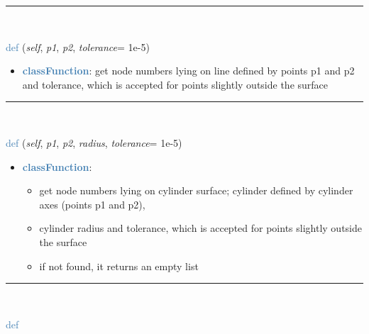 \begin{itemize}[leftmargin=1.4cm]
\begin{itemize}[leftmargin=1.4cm]
\begin{itemize}[leftmargin=1.4cm]
\begin{itemize}[leftmargin=0.5cm]
\begin{itemize}[leftmargin=1.4cm]
\begin{itemize}[leftmargin=1.4cm]
\begin{itemize}[leftmargin=1.4cm]
\begin{itemize}[leftmargin=0.5cm]
%
\noindent\rule{8cm}{0.75pt}\vspace{1pt} \\ 
\begin{flushleft}
\noindent \textcolor{steelblue}{def {\bf {}}}\label{sec:FEM:FEMinterface:GetNodesOnLine}
({\it self}, {\it p1}, {\it p2}, {\it tolerance}= 1e-5)
\end{flushleft}
\setlength{\itemindent}{0.7cm}
\begin{itemize}[leftmargin=0.7cm]
\item[--]\textcolor{steelblue}{\bf classFunction}: get node numbers lying on line defined by points p1 and p2 and tolerance, which is accepted for points slightly outside the surface
\vspace{12pt}\end{itemize}
%
\noindent\rule{8cm}{0.75pt}\vspace{1pt} \\ 
\begin{flushleft}
\noindent \textcolor{steelblue}{def {\bf {}}}\label{sec:FEM:FEMinterface:GetNodesOnCylinder}
({\it self}, {\it p1}, {\it p2}, {\it radius}, {\it tolerance}= 1e-5)
\end{flushleft}
\setlength{\itemindent}{0.7cm}
\begin{itemize}[leftmargin=0.7cm]
\item[--]\textcolor{steelblue}{\bf classFunction}: \vspace{-6pt}
\begin{itemize}[leftmargin=1.2cm]
\setlength{\itemindent}{-0.7cm}
\item[]get node numbers lying on cylinder surface; cylinder defined by cylinder axes (points p1 and p2),
\item[]cylinder radius and tolerance, which is accepted for points slightly outside the surface
\item[]if not found, it returns an empty list
\end{itemize}
\vspace{12pt}\end{itemize}
%
\noindent\rule{8cm}{0.75pt}\vspace{1pt} \\ 
\begin{flushleft}
\noindent \textcolor{steelblue}{def {\bf {}}}\label{sec:FEM:FEMinterface:GetNodesOnCircle}

\end{flushleft}
\end{itemize}
\end{itemize}
\end{itemize}
\end{itemize}
\end{itemize}
\end{itemize}
\end{itemize}
\end{itemize}
